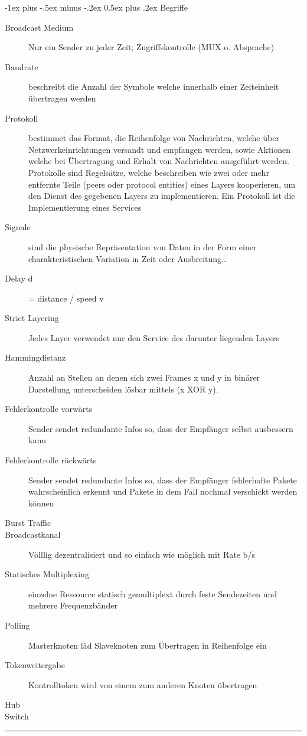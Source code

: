 \documentclass[10pt,landscape]{article}
\makeatletter
\renewcommand{\section}{\@startsection{section}{1}{0mm}%
                                {-1ex plus -.5ex minus -.2ex}%
                                {0.5ex plus .2ex}%
                                {\normalfont\large\bfseries}}
\makeatother
\begin{document}
\begin{multicols}{3}
\section{Begriffe}
\begin{description}
    \item[Broadcast Medium] Nur ein Sender zu jeder Zeit; Zugriffskontrolle (MUX o. Absprache)
    \item[Baudrate] beschreibt die Anzahl der Symbole welche innerhalb einer Zeiteinheit übertragen werden
    \item[Protokoll] bestimmet das Format, die Reihenfolge von Nachrichten, welche über Netzwerkeinrichtungen versandt und empfangen werden, sowie Aktionen welche bei Übertragung und Erhalt von Nachrichten ausgeführt werden. Protokolle sind Regelsätze, welche beschreiben wie zwei oder mehr entfernte Teile (peers oder protocol entities) eines Layers kooperieren, um den Dienst des gegebenen Layers zu implementieren. Ein Protokoll ist die Implementierung eines Services
    \item[Signale] sind die physische Repräsentation von Daten in der Form einer charakteristischen Variation in Zeit oder Ausbreitung…
    \item[Delay d] = distance / speed v
    \item[Strict Layering] Jedes Layer verwendet nur den Service des darunter liegenden Layers
    \item[Hammingdistanz] Anzahl an Stellen an denen sich zwei Frames x und y in binärer Darstellung unterscheiden lösbar mittels (x XOR y). 
    \item[Fehlerkontrolle vorwärts] Sender sendet redundante Infos so, dass der Empfänger selbst ausbessern kann
    \item[Fehlerkontrolle rückwärts] Sender sendet redundante Infos so, dass der Empfänger fehlerhafte Pakete wahrscheinlich erkennt und Pakete in dem Fall nochmal verschickt werden können
    \item[Burst Traffic]
    \item[Broadcastkanal] Völllig dezentralisiert und so einfach wie möglich mit Rate b/s 
    \item[Statisches Multiplexing] einzelne Ressource statisch gemultiplext durch feste Sendezeiten und mehrere Frequenzbänder
    \item[Polling] Masterknoten läd Slaveknoten zum Übertragen in Reihenfolge ein
    \item[Tokenweitergabe] Kontrolltoken wird von einem zum anderen Knoten übertragen
    \item[Hub]
    \item[Switch]  

\end{description}

\rule{0.3\linewidth}{0.25pt}
\scriptsize


\end{multicols}
\end{document}
